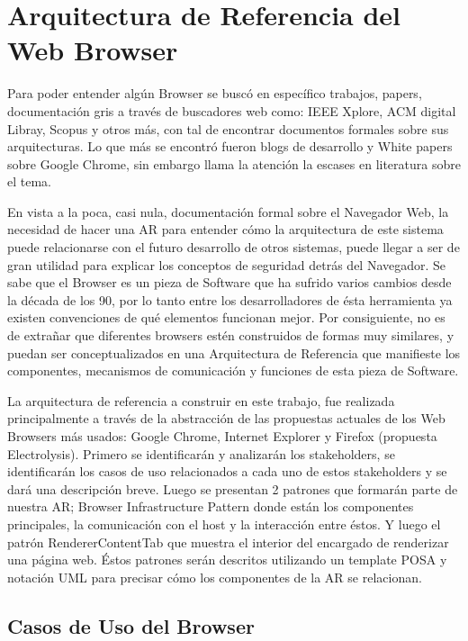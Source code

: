 \chapter{Arquitectura de Referencia del Web Browser}
\label{chap5:ArqRefWB}


Para poder entender algún Browser se buscó en específico trabajos, papers, documentación gris a través de buscadores web como: IEEE Xplore, ACM digital Libray, Scopus y otros más, con tal de encontrar documentos formales sobre sus arquitecturas. Lo que más se encontró fueron blogs de desarrollo y White papers sobre Google Chrome, sin embargo llama la atención la escases en literatura sobre el tema. 


En vista a la poca, casi nula, documentación formal sobre el Navegador Web, la necesidad de hacer una AR para entender cómo la arquitectura de este sistema puede relacionarse con el futuro desarrollo de otros sistemas, puede llegar a ser de gran utilidad para explicar los conceptos de seguridad detrás del Navegador. Se sabe que el Browser es un pieza de Software que ha sufrido varios cambios desde la década de los 90, por lo tanto entre los desarrolladores de ésta herramienta ya existen convenciones de qué elementos funcionan mejor. Por consiguiente, no es de extrañar que diferentes browsers estén construidos de formas muy similares, y puedan ser conceptualizados en una Arquitectura de Referencia que manifieste los componentes, mecanismos de comunicación y funciones de esta pieza de Software. 


La arquitectura de referencia a construir en este trabajo, fue realizada principalmente a través de la abstracción de las propuestas actuales de los Web Browsers más usados: Google Chrome, Internet Explorer y Firefox (propuesta Electrolysis). Primero se identificarán y analizarán los stakeholders, se identificarán los casos de uso relacionados a cada uno de estos stakeholders y se dará una descripción breve. Luego se presentan 2 patrones que formarán parte de nuestra AR; Browser Infrastructure Pattern donde están los componentes principales, la comunicación con el host y la interacción entre éstos. Y luego el patrón RendererContentTab que muestra el interior del encargado de renderizar una página web. Éstos patrones serán descritos utilizando un template POSA \cite{buschman1996system} y notación UML para precisar cómo los componentes de la AR se relacionan. 

\section{Casos de Uso del Browser}
